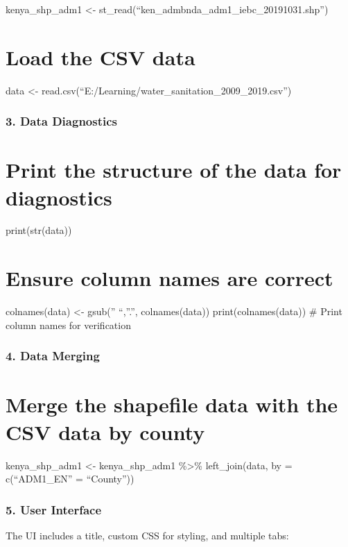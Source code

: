 \documentclass[
]{article}
\begin{document}
kenya\_shp\_adm1 \textless-
st\_read(``ken\_admbnda\_adm1\_iebc\_20191031.shp'')

\section{Load the CSV data}\label{load-the-csv-data}

data \textless-
read.csv(``E:/Learning/water\_sanitation\_2009\_2019.csv'')

\subsubsection{3. Data Diagnostics}\label{data-diagnostics}

\section{Print the structure of the data for
diagnostics}\label{print-the-structure-of-the-data-for-diagnostics}

print(str(data))

\section{Ensure column names are
correct}\label{ensure-column-names-are-correct}

colnames(data) \textless- gsub('' ``,''.'', colnames(data))
print(colnames(data)) \# Print column names for verification

\subsubsection{4. Data Merging}\label{data-merging}

\section{Merge the shapefile data with the CSV data by
county}\label{merge-the-shapefile-data-with-the-csv-data-by-county}

kenya\_shp\_adm1 \textless- kenya\_shp\_adm1 \%\textgreater\%
left\_join(data, by = c(``ADM1\_EN'' = ``County''))

\subsubsection{5. User Interface}\label{user-interface}

The UI includes a title, custom CSS for styling, and multiple tabs:
\end{document}
